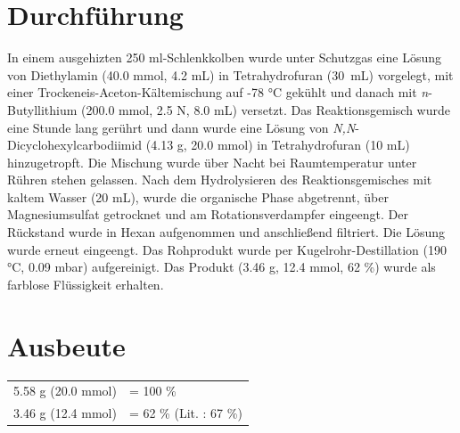 \documentclass[12pt]{article}
\begin{document}
\begin{onehalfspace}
\section{Durchführung \cite{vor}}
In einem ausgehizten 250 ml-Schlenkkolben wurde unter Schutzgas eine Lösung von Diethylamin (40.0 \si{\milli\mol}, 4.2 \si{\milli\liter}) in Tetrahydrofuran (30~\si{\milli\liter}) vorgelegt, mit einer Trockeneis-Aceton-Kältemischung auf -78 \si{\celsius} gekühlt und danach mit \textit{n}-Butyllithium (200.0 \si{\milli\mol}, 2.5 N, 8.0 \si{\milli\liter}) versetzt. Das Reaktionsgemisch wurde eine Stunde lang gerührt und dann wurde eine Lösung von \textit{N,N}-Dicyclohexylcarbodiimid (4.13 \si{\gram}, 20.0 \si{\milli\mol}) in Tetrahydrofuran (10 \si{\milli\liter}) hinzugetropft. Die Mischung wurde über Nacht bei Raumtemperatur unter Rühren stehen gelassen. Nach dem Hydrolysieren des Reaktionsgemisches mit kaltem Wasser (20 \si{\milli\liter}), wurde die organische Phase abgetrennt, über Magnesiumsulfat getrocknet und am Rotationsverdampfer eingeengt. Der Rückstand wurde in Hexan aufgenommen und anschließend filtriert. Die Lösung wurde erneut eingeengt. Das Rohprodukt wurde per Kugelrohr-Destillation (190 \si{\celsius}, 0.09 \si{\milli\bar}) aufgereinigt. Das Produkt (3.46 g, 12.4 mmol, 62 \%) wurde als farblose Flüssigkeit erhalten.
\section{Ausbeute}
\begin{tabular}{ ll}
  5.58 \si{\gram} (20.0 \si{\milli\mol})   & = 100 \%\\
  3.46 \si{\gram} (12.4 \si{\milli\mol})   & = 62 \% (Lit.\cite{vor} : 67 \%) \\
 \end{tabular}
\newpage


\end{onehalfspace}
\end{document}
